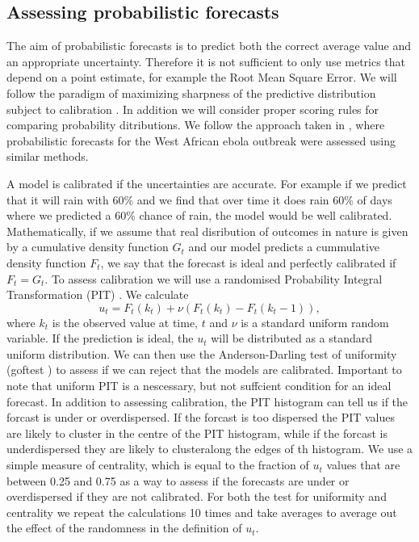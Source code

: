 \documentclass[12pt]{article}
\begin{document}
\subsection{Assessing probabilistic forecasts}
The aim of probabilistic forecasts is to predict both the correct average value and an appropriate uncertainty. Therefore it is not sufficient to only use metrics that depend on a point estimate, for example the Root Mean Square Error. We will follow the paradigm of maximizing sharpness of the predictive distribution subject to calibration \cite{gneitingProbabilisticForecastsCalibration2007}. In addition we will consider proper scoring rules for comparing probability ditributions. We follow the approach taken in \cite{funkAssessingPerformanceRealtime2019}, where probabilistic forecasts for the West African ebola outbreak were assessed using similar methods.

A model is calibrated if the uncertainties are accurate. For example if we predict that it will rain with 60\% and we find that over time it does rain 60\% of days where we predicted a 60\% chance of rain, the model would be well calibrated. Mathematically, if we assume that real disribution of outcomes in nature is given by a cumulative density function $G_t$ and our model predicts a cummulative density function $F_t$, we say that the forecast is ideal and perfectly calibrated if $F_t=G_t$. To assess calibration we will use a randomised Probability Integral Transformation (PIT) \cite{czadoPredictiveModelAssessment2009a}. We calculate
\[ u_t = F_t(k_t) + \nu (F_t(k_t) - F_t(k_t -1)),\]
where $k_t$ is the observed value at time, $t$ and $\nu$ is a standard uniform random variable. If the prediction is ideal, the $u_t$ will be distributed as a standard uniform distribution. We can then use the Anderson-Darling test of uniformity (goftest \cite{farawayGoftestClassicalGoodnessofFit2017}) to assess if we can reject that the models are calibrated. Important to note that uniform PIT is a nescessary, but not suffcient condition for an ideal forecast. In addition to assessing calibration, the PIT histogram can tell us if the forcast is under or overdispersed. If the forcast is too dispersed the PIT values are likely to cluster in the centre of the PIT histogram, while if the forcast is underdispersed they are likely to clusteralong the edges of th histogram. We use a simple measure of centrality, which is equal to the fraction of $u_t$ values that are between 0.25 and 0.75 as a way to assess if the forecasts are under or overdispersed if they are not calibrated. For both the test for uniformity and centrality we repeat the calculations 10 times and take averages to average out the effect of the randomness in the definition of $u_t$. 
\end{document}

